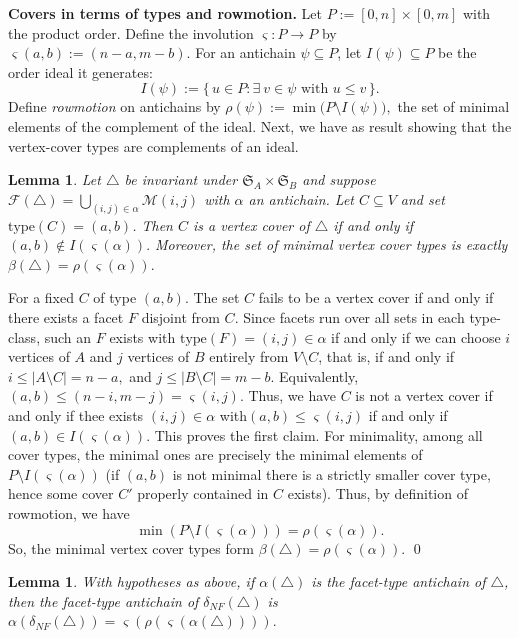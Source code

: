 \documentclass[12pt]{article}
\renewenvironment{proof}{{\noindent\bfseries Proof.}}{\qed}
\theoremstyle{plain}
\newtheorem{lemma}[theorem]{Lemma}
\theoremstyle{definition}
\begin{document}
	\medskip
	\noindent\textbf{Covers in terms of types and rowmotion.}
	Let $P:=[0,n]\times[0,m]$ with the product order.
	Define the involution $\varsigma:P\to P$ by $\varsigma(a,b):=(n-a, m-b).$
	For an antichain $\psi\subseteq P$, let $I(\psi)\subseteq P$ be the order ideal it generates:
	\[
	I(\psi):=\{\,u\in P:\exists~ v\in\psi \text{ with } u\le v\,\}.
	\]
	Define \emph{rowmotion} on antichains by $\rho(\psi):=\min\bigl(P\setminus I(\psi)\bigr),$ 
	the set of minimal elements of the complement of the ideal. Next, we have as result showing that the vertex-cover types are complements of an ideal.	
	\begin{lemma}\label{lem:covers-as-ideal}
		Let $\bigtriangleup$ be invariant under $\mathfrak{S}_A\times\mathfrak{S}_B$ and suppose
		$\mathcal{F}(\bigtriangleup)=\bigcup_{(i,j)\in\alpha}\mathcal{M}(i,j)$ with $\alpha$ an antichain.
		Let $C\subseteq V$ and set $\mathrm{type}(C)=(a,b)$. Then $C$ is a vertex cover of $\bigtriangleup$ if and only if $(a,b)\notin I(\varsigma(\alpha)).$ 
		Moreover, the set of \emph{minimal} vertex cover types is exactly $\beta(\bigtriangleup)=\rho(\varsigma(\alpha)).$ 
	\end{lemma}
	
	\begin{proof}
		For a fixed $C$ of type $(a,b)$. The set $C$ fails to be a vertex cover if and only if there exists a facet
		$F$ disjoint from $C$. Since facets run over all sets in each type-class, such an $F$ exists
		with $\mathrm{type}(F)=(i,j)\in\alpha$ if and only if we can choose $i$ vertices of $A$ and $j$ vertices of $B$
		entirely from $V\setminus C$, that is, if and only if $i\le |A\setminus C|=n-a,$ and  $j\le |B\setminus C|=m-b.$ Equivalently, $(a,b)\le(n-i,m-j)=\varsigma(i,j)$. Thus, we have $C$ is  not a vertex cover if and only if thee exists $(i,j)\in\alpha$ with$(a,b)\le\varsigma(i,j)$ if and only if $(a,b)\in I(\varsigma(\alpha)).$
		This proves the first claim. For minimality, among all cover types, the minimal ones are precisely the minimal elements of
		$P\setminus I(\varsigma(\alpha))$ (if $(a,b)$ is not minimal there is a strictly smaller cover type,
		hence some cover $C'$ properly contained in $C$ exists). Thus, by definition of rowmotion, we have
		\[
		\min(P\setminus I(\varsigma(\alpha)))=\rho(\varsigma(\alpha)).
		\]
		So, the minimal vertex cover types form $\beta(\bigtriangleup)=\rho(\varsigma(\alpha))$.
	\end{proof}
	
	\begin{lemma}\label{lem:type-update}
		With hypotheses as above, if $\alpha(\bigtriangleup)$ is the facet-type antichain of $\bigtriangleup$, then
		the facet-type antichain of $\delta_{NF}(\bigtriangleup)$ is $\alpha(\delta_{NF}(\bigtriangleup))=\varsigma(\rho(\varsigma(\alpha(\bigtriangleup)))).$ 
	\end{lemma}
	
\end{document}

